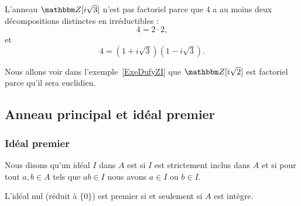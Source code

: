 \begin{example} \label{EXooCWJUooCDJqkr}
    L'anneau \( \eZ[i\sqrt{3}]\) n'est pas factoriel parce que \( 4\) a au moins deux décompositions distinctes en irréductibles :
    \begin{equation}
        4=2\cdot 2,
    \end{equation}
    et
    \begin{equation}
        4=(1+i\sqrt{3})(1-i\sqrt{3}).
    \end{equation}
\end{example}

Nous allons voir dans l'exemple~\ref{ExeDufyZI} que \( \eZ[i\sqrt{2}]\) est factoriel parce qu'il sera euclidien.

\subsection{Anneau principal et idéal premier}
\subsubsection{Idéal premier}

\begin{definition}      \label{DEFooAQSZooVhvQWv}
    Nous disons qu'un idéal \( I\) dans \( A\) est  si \( I\) est strictement inclus dans \( A\) et si pour tout \( a,b\in A\) tels que \( ab\in I\) nous avons \( a\in I\) ou \( b\in I\).
\end{definition}

\begin{lemma}       \label{LEMooYRPBooYxXXsi}
    L'idéal nul (réduit à \( \{ 0 \}\)) est premier si et seulement si \( A\) est intègre.
\end{lemma}

